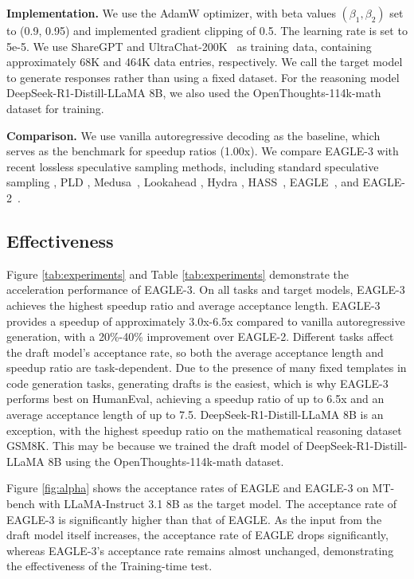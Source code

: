 \documentclass[11pt]{article}
\begin{document}
\textbf{Implementation.} We use the AdamW optimizer, with beta values $(\beta_1,\beta_2 )$ set to (0.9, 0.95) and implemented gradient clipping of 0.5. The learning rate is set to 5e-5. We use ShareGPT and UltraChat-200K~\cite{ding2023enhancing} as training data, containing approximately 68K and 464K data entries, respectively. We call the target model to generate responses rather than using a fixed dataset. For the reasoning model DeepSeek-R1-Distill-LLaMA 8B, we also used the OpenThoughts-114k-math dataset for training.

\textbf{Comparison.}  We use vanilla autoregressive decoding as the baseline, which serves as the benchmark for speedup ratios (1.00x). We compare EAGLE-3 with recent lossless speculative sampling methods, including standard speculative sampling \cite{leviathan2023fast,chen2023accelerating,gante2023assisted}, PLD \cite{saxena2023prompt}, Medusa~\cite{cai2024medusa}, Lookahead \cite{fu2023lookahead}, Hydra \cite{ankner2024hydra}, HASS~\cite{zhang2024learning}, EAGLE~\cite{li2024eagle}, and EAGLE-2~\cite{li2024eagle2}.

\subsection{Effectiveness}


Figure \ref{tab:experiments} and Table \ref{tab:experiments} demonstrate the acceleration performance of EAGLE-3. On all tasks and target models, EAGLE-3 achieves the highest speedup ratio and average acceptance length. EAGLE-3 provides a speedup of approximately 3.0x-6.5x compared to vanilla autoregressive generation, with a 20\%-40\% improvement over EAGLE-2. Different tasks affect the draft model's acceptance rate, so both the average acceptance length and speedup ratio are task-dependent. Due to the presence of many fixed templates in code generation tasks, generating drafts is the easiest, which is why EAGLE-3 performs best on HumanEval, achieving a speedup ratio of up to 6.5x and an average acceptance length of up to 7.5. 
DeepSeek-R1-Distill-LLaMA 8B is an exception, with the highest speedup ratio on the mathematical reasoning dataset GSM8K. This may be because we trained the draft model of DeepSeek-R1-Distill-LLaMA 8B using the OpenThoughts-114k-math dataset.

Figure \ref{fig:alpha} shows the acceptance rates of EAGLE and EAGLE-3 on MT-bench with LLaMA-Instruct 3.1 8B as the target model. The acceptance rate of EAGLE-3 is significantly higher than that of EAGLE. As the input from the draft model itself increases, the acceptance rate of EAGLE drops significantly, whereas EAGLE-3’s acceptance rate remains almost unchanged, demonstrating the effectiveness of the Training-time test.
\end{document}
